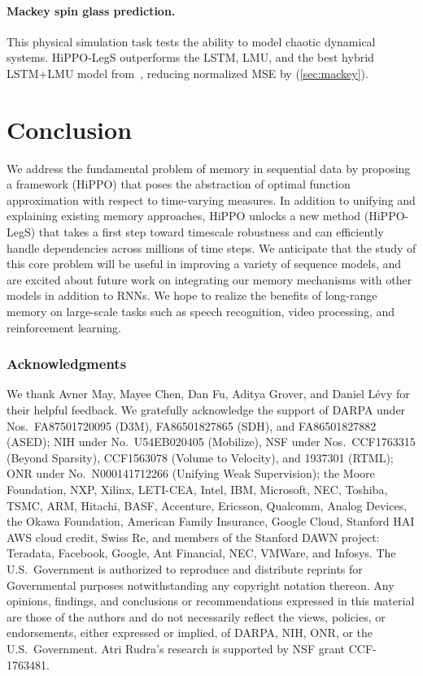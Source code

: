\documentclass{article}
\begin{document}
\paragraph{Mackey spin glass prediction.} This physical simulation task tests the
ability to model chaotic dynamical systems. HiPPO-LegS outperforms the LSTM,
LMU, and the best hybrid LSTM+LMU model from~\cite{voelker2019legendre},
reducing normalized MSE by  (\cref{sec:mackey}).

 

\section{Conclusion}
\label{sec:conclusion}

We address the fundamental problem of memory in
sequential data by proposing a framework (HiPPO) that poses the abstraction
of optimal function approximation with respect to time-varying measures.
In addition to unifying and explaining existing memory approaches,
HiPPO unlocks a new method (HiPPO-LegS) that takes a first step toward timescale robustness
and can efficiently handle dependencies across millions of time steps.
We anticipate that the study of this core problem
will be useful in improving a variety of sequence models,
and are excited about future work on integrating our memory mechanisms with other models in addition to RNNs.
We hope to realize the benefits of long-range memory on large-scale tasks such
as speech recognition, video processing, and reinforcement learning.





 

\subsubsection*{Acknowledgments}

We thank
Avner May, Mayee Chen, Dan Fu,
Aditya Grover,
and Daniel L\'{e}vy
for their helpful feedback.
We gratefully acknowledge the support of DARPA under Nos.\ FA87501720095 (D3M),
FA86501827865 (SDH), and FA86501827882 (ASED); NIH under No.\ U54EB020405
(Mobilize), NSF under Nos.\ CCF1763315 (Beyond Sparsity), CCF1563078 (Volume to
Velocity), and 1937301 (RTML); ONR under No.\ N000141712266 (Unifying Weak
Supervision); the Moore Foundation, NXP, Xilinx, LETI-CEA, Intel, IBM,
Microsoft, NEC, Toshiba, TSMC, ARM, Hitachi, BASF, Accenture, Ericsson,
Qualcomm, Analog Devices, the Okawa Foundation, American Family Insurance,
Google Cloud, Stanford HAI AWS cloud credit, Swiss Re, and members of the Stanford DAWN project: Teradata,
Facebook, Google, Ant Financial, NEC, VMWare, and Infosys.
The U.S.\ Government is authorized to reproduce and distribute reprints for
Governmental purposes notwithstanding any copyright notation thereon.
Any opinions, findings, and conclusions or recommendations expressed in this
material are those of the authors and do not necessarily reflect the views,
policies, or endorsements, either expressed or implied, of DARPA, NIH, ONR, or
the U.S.\ Government.
Atri Rudra’s research is supported by NSF grant CCF-1763481.
\end{document}
